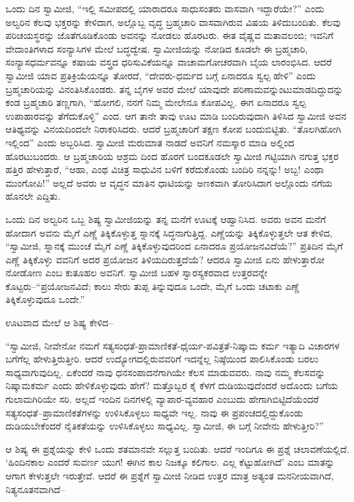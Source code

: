 ಒಂದು ದಿನ ಸ್ವಾಮೀಜಿ, “ಇಲ್ಲಿ ಸಮೀಪದಲ್ಲಿ ಯಾರಾದರೂ ಸಾಧುಸಂತರು ವಾಸವಾಗಿ ಇದ್ದಾರೆಯೇ?” ಎಂದು ಅಲ್ವರಿನ ಕೆಲವು ಭಕ್ತರನ್ನು ಕೇಳಿದಾಗ, ಅಲ್ಲೊಬ್ಬ ವೃದ್ಧ ಬ್ರಹ್ಮಚಾರಿ ವಾಸವಾಗಿರುವ ವಿಷಯ ತಿಳಿದುಬಂದಿತು. ಕೆಲವು ಪರಿಚಯಸ್ಥರನ್ನು ಜೊತೆಗೂಡಿಕೊಂಡು ಅವನನ್ನು ನೋಡಲು ಹೊರಟರು. ಈತ ವೈಷ್ಣವ ಮತಾವಲಂಬಿ; ಇವನಿಗೆ ವೇದಾಂತಿಗಳಾದ ಸಂನ್ಯಾಸಿಗಳ ಮೇಲೆ ಬದ್ಧದ್ವೇಷ. ಸ್ವಾಮೀಜಿಯನ್ನು ನೋಡಿದ ಕೂಡಲೇ ಈ ಬ್ರಹ್ಮಚಾರಿ, ಸಂನ್ಯಾಸಧರ್ಮವನ್ನೂ ಕಷಾಯ ವಸ್ತ್ರದ ಧರಿಸುವಿಕೆಯನ್ನೂ ವಾಚಾಮಗೋಚರವಾಗಿ ಬೈಯ ಲಾರಂಭಿಸಿದ. ಆದರೆ ಸ್ವಾಮೀಜಿ ಯಾವ ಪ್ರತಿಕ್ರಿಯೆಯನ್ನೂ ತೋರದೆ, “ದೇವರು-ಧರ್ಮದ ಬಗ್ಗೆ ಏನಾದರೂ ಸ್ವಲ್ಪ ಹೇಳಿ” ಎಂದು ಬ್ರಹ್ಮಚಾರಿಯನ್ನು ವಿನಂತಿಸಿಕೊಂಡರು. ತನ್ನ ಬೈಗಳ ಅವರ ಮೇಲೆ ಯಾವುದೇ ಪರಿಣಾಮವನ್ನುಂಟುಮಾಡದಿದ್ದುದನ್ನು ಕಂಡ ಬ್ರಹ್ಮಚಾರಿ ತಣ್ಣಗಾಗಿ, “ಹೋಗಲಿ, ನನಗೆ ನಿಮ್ಮ ಮೇಲೇನೂ ಕೋಪವಿಲ್ಲ. ಈಗ ಏನಾದರೂ ಸ್ವಲ್ಪ ಉಪಾಹಾರವನ್ನು ತೆಗೆದುಕೊಳ್ಳಿ” ಎಂದ. ಆಗ ತಾನೇ ತಾವು ಊಟ ಮಾಡಿ ಬಂದಿರುವುದಾಗಿ ತಿಳಿಸಿದ ಸ್ವಾಮೀಜಿ ಅವನ ಆತಿಥ್ಯವನ್ನು ವಿನಯದಿಂದಲೇ ನಿರಾಕರಿಸಿದರು. ಆದರೆ ಬ್ರಹ್ಮಚಾರಿಗೆ ತಕ್ಷಣ ಕೋಪ ಬಂದುಬಿಟ್ಟಿತು. “ತೊಲಗಿಹೋಗಿ ಇಲ್ಲಿಂದ” ಎಂದು ಅಬ್ಬರಿಸಿದ. ಸ್ವಾಮೀಜಿ ಮರುಮಾತ ನಾಡದೆ ಅವನಿಗೆ ನಮಸ್ಕಾರ ಮಾಡಿ ಅಲ್ಲಿಂದ ಹೊರಟುಬಂದರು. ಆ ಬ್ರಹ್ಮಚಾರಿಯ ಆಶ್ರಮ ದಿಂದ ಹೊರಗೆ ಬಂದಕೂಡಲೇ ಸ್ವಾಮೀಜಿ ಗಟ್ಟಿಯಾಗಿ ನಗುತ್ತ ಭಕ್ತರ ಹತ್ತಿರ ಹೇಳುತ್ತಾರೆ, “ಆಹಾ, ಎಂಥ ವಿಚಿತ್ರ ಸಾಧುವಿನ ಬಳಿಗೆ ಕರೆದುಕೊಂಡು ಬಂದಿರಿ ನನ್ನನ್ನು! ಅಬ್ಬ! ಎಂಥಾ ಮುಂಗೋಪಿ!” ಅಲ್ಲದೆ ಅವರು ಆ ವೃದ್ಧನ ಮಾತಿನ ಧಾಟಿಯನ್ನು ಅಣಕವಾಗಿ ತೋರಿಸಿದಾಗ ಅಲ್ಲೊಂದು ನಗೆಯ ಹೊನಲೇ ಎದ್ದಿತು.

ಒಂದು ದಿನ ಅಲ್ವರಿನ ಒಬ್ಬ ಶಿಷ್ಯ ಸ್ವಾಮೀಜಿಯನ್ನು ತನ್ನ ಮನೆಗೆ ಊಟಕ್ಕೆ ಆಹ್ವಾನಿಸಿದ. ಅವರು ಅವನ ಮನೆಗೆ ಹೋದಾಗ ಅವನು ಮೈಗೆ ಎಣ್ಣೆ ತಿಕ್ಕಿಕೊಳ್ಳುತ್ತ ಸ್ನಾನಕ್ಕೆ ಸಿದ್ಧನಾಗುತ್ತಿದ್ದ. ಎಣ್ಣೆಯನ್ನು ತಿಕ್ಕಿಕೊಳ್ಳುತ್ತಲೇ ಆತ ಕೇಳಿದ, “ಸ್ವಾಮೀಜಿ, ಸ್ನಾನಕ್ಕೆ ಮುಂಚೆ ಮೈಗೆ ಎಣ್ಣೆ ತಿಕ್ಕಿಕೊಳ್ಳುವುದರಿಂದ ಏನಾದರೂ ಪ್ರಯೋಜನವಿದೆಯೆ?” ಪ್ರತಿದಿನ ಮೈಗೆ ಎಣ್ಣೆ ತಿಕ್ಕಿಕೊಳ್ಳು ವವನಿಗೆ ಅದರ ಪ್ರಯೋಜನ ತಿಳಿಯದಿರುತ್ತದೆಯೆ? ಆದರೂ ಸ್ವಾಮೀಜಿ ಏನು ಹೇಳುತ್ತಾರೋ ನೋಡೋಣ ಎಂಬ ಕುತೂಹಲ ಅವನಿಗೆ. ಸ್ವಾಮೀಜಿ ಬಹಳ ಸ್ವಾರಸ್ಯಕರವಾದ ಉತ್ತರವನ್ನೇ ಕೊಟ್ಟರು–“ಪ್ರಯೋಜನವಿದೆ; ಕಾಲು ಸೇರು ತುಪ್ಪ ತಿನ್ನುವುದೂ ಒಂದೇ, ಮೈಗೆ ಒಂದು ಚಟಾಕು ಎಣ್ಣೆ ತಿಕ್ಕಿಕೊಳ್ಳುವುದೂ ಒಂದೇ.”

ಊಟವಾದ ಮೇಲೆ ಆ ಶಿಷ್ಯ ಕೇಳಿದ–

“ಸ್ವಾಮೀಜಿ, ನೀವೇನೋ ನಮಗೆ ಸತ್ಯಸಂಧತೆ-ಪ್ರಾಮಾಣಿಕತೆ-ಧೈರ್ಯ-ಪವಿತ್ರತೆ-ನಿಷ್ಕಾಮ ಕರ್ಮ ಇತ್ಯಾದಿ ವಿಚಾರಗಳ ಬಗೆಗೆಲ್ಲ ಹೇಳುತ್ತಿರುತ್ತೀರಿ. ಆದರೆ ಉದ್ಯೋಗದಲ್ಲಿರುವವರಿಗೆ ಇದನ್ನೆಲ್ಲ ನಿಷ್ಠೆಯಿಂದ ಪಾಲಿಸಿಕೊಂಡು ಬರಲು ಸಾಧ್ಯವಾಗುವುದಿಲ್ಲ. ಏಕೆಂದರೆ ನಾವು ಧನಸಂಪಾದನೆಗಾಗಿಯೇ ಕೆಲಸ ಮಾಡುವವರು. ನಾವು ನಮ್ಮ ಕೆಲಸವನ್ನು ನಿಷ್ಕಾಮಕರ್ಮ ಎಂದು ಹೇಳಿಕೊಳ್ಳುವುದು ಹೇಗೆ? ಮತ್ತೊಬ್ಬರ ಕೈ ಕೆಳಗೆ ದುಡಿಯುವುದೆಂದರೆ ಅದೊಂದು ಬಗೆಯ ಗುಲಾಮಗಿರಿಯೇ ಸರಿ. ಅಲ್ಲದೆ ಇಂದಿನ ದಿನಗಳಲ್ಲಿ ವ್ಯಾಪಾರ-ವ್ಯವಹಾರ ಎಂಬುದು ಹೇಗಾಗಿಬಿಟ್ಟಿದೆಯೆಂದರೆ ಸತ್ಯಸಂಧತೆ–ಪ್ರಾಮಾಣಿಕತೆಗಳನ್ನು ಉಳಿಸಿಕೊಳ್ಳಲು ಸಾಧ್ಯವೇ ಇಲ್ಲ. ನಾವು ಈ ಪ್ರಪಂಚದಲ್ಲಿದ್ದುಕೊಂಡು ದುಡಿಯಬೇಕೆಂದರೆ ನೈತಿಕತೆಯನ್ನು ಉಳಿಸಿಕೊಳ್ಳಲು ಸಾಧ್ಯವಿಲ್ಲ. ಸ್ವಾಮೀಜಿ, ಈ ಬಗ್ಗೆ ನೀವೇನು ಹೇಳುತ್ತೀರಿ?”

ಆ ಶಿಷ್ಯ ಈ ಪ್ರಶ್ನೆಯನ್ನು ಕೇಳಿ ಒಂದು ಶತಮಾನವೇ ಸಲ್ಲುತ್ತ ಬಂದಿತು. ಆದರೆ ಇಂದಿಗೂ ಈ ಪ್ರಶ್ನೆ ಚಲಾವಣೆಯಲ್ಲಿದೆ. ‘ಹಿಂದಿನಕಾಲ ಎಂದರೆ ಸುವರ್ಣ ಯುಗ! ಈಗಿನ ಕಾಲ ನಿಜಕ್ಕೂ ಕಲಿಗಾಲ. ಎಲ್ಲ ಕೆಟ್ಟುಹೋಗಿದೆ’ ಎಂಬ ಮಾತನ್ನು ಆಗಾಗ ಕೇಳುತ್ತಲೇ ಇರುತ್ತೇವೆ. ಆದರೆ ಈ ಪ್ರಶ್ನೆಗೆ ಸ್ವಾಮೀಜಿ ನೀಡಿದ ಉತ್ತರ ಮಾತ್ರ ಅತ್ಯಂತ ಮನನೀಯವಾಗಿದೆ, ನಿತ್ಯನೂತನವಾಗಿದೆ–

